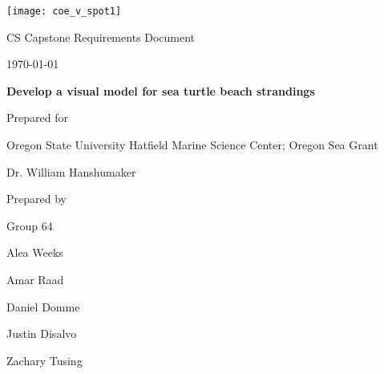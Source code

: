 \documentclass[onecolumn, draftclsnofoot,10pt, compsoc]{IEEEtran}
\def \CapstoneTeamName{     Beached Marine Critters Project Team}
\def \CapstoneTeamNumber{       64}
\def \GroupMemberOne{           Alea Weeks}
\def \GroupMemberTwo{           Amar Raad}
\def \GroupMemberThree{         Daniel Domme}
\def \GroupMemberFour{          Justin Disalvo}
\def \GroupMemberFive{          Zachary Tusing}
\def \CapstoneProjectName{      Develop a visual model for sea turtle beach strandings}
\def \CapstoneSponsorCompany{   Oregon State University Hatfield Marine Science Center; Oregon Sea Grant}
\def \CapstoneSponsorPerson{        Dr. William Hanshumaker}
\def \DocType{      %
                Requirements Document
                }
\newcommand{\NameSigPair}[1]{\par
\makebox[2.75in][r]{#1} \hfil   \makebox[3.25in]{\makebox[2.25in]{\hrulefill} \hfill        \makebox[.75in]{\hrulefill}}
\par\vspace{-12pt} \textit{\tiny\noindent
\makebox[2.75in]{} \hfil        \makebox[3.25in]{\makebox[2.25in][r]{Signature} \hfill  \makebox[.75in][r]{Date}}}}
\renewcommand{\NameSigPair}[1]{#1}
\begin{document}
\begin{titlepage}
    \begin{singlespace}
     \texttt{[image: coe\_v\_spot1]}
        \hfill 
        \par\vspace{.2in}
        \centering
        \scshape{
            \huge CS Capstone \DocType \par
            {\normalsize\today}\par
            \vspace{.5in}
            \textbf{\Huge\CapstoneProjectName}\par
            \vspace{1in}
            {\Large Prepared for}\par
            \huge \CapstoneSponsorCompany\par
            \vspace{5pt}
            {\Large\NameSigPair{\CapstoneSponsorPerson}\par}
            \vspace{.5in}
            {\large Prepared by }\par
            Group\CapstoneTeamNumber\par
            \vspace{5pt}
            {\Large
                \NameSigPair{\GroupMemberOne}\par
                \NameSigPair{\GroupMemberTwo}\par
                \NameSigPair{\GroupMemberThree}\par
                \NameSigPair{\GroupMemberFour}\par
            \NameSigPair{\GroupMemberFive}\par
            }
            \vspace{20pt}
        }
        \vfill
        \begin{abstract}

\end{abstract}
\end{singlespace}
\end{titlepage}
\end{document}
